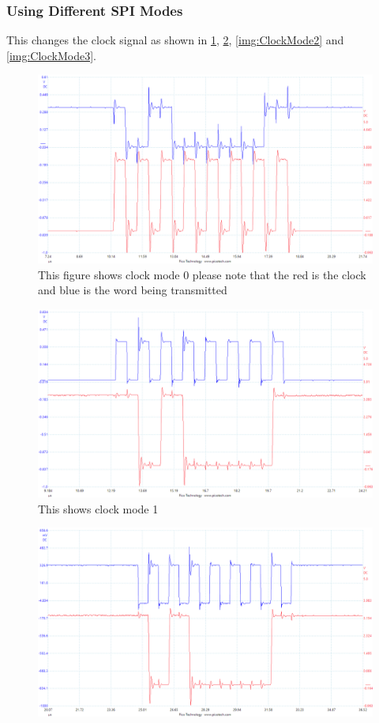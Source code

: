 \documentclass[a4paper,12pt]{scrartcl}
\begin{document}
{{			\subsubsection{Using Different SPI Modes}
			{
				This changes the clock signal as shown in \cref{img:ClockMode0}, \cref{img:ClockMode1}, \cref{img:ClockMode2} and \cref{img:ClockMode3}.
				\begin{figure}[h]
					\centering
					\includegraphics[width=\textwidth]{Ex1/mode0}
					\caption{This figure shows clock mode 0 please note that the red is the clock and blue is the word being transmitted}
					\label{img:ClockMode0}
				\end{figure}
				\begin{figure}[h]
					\centering
					\includegraphics[width=\textwidth]{Ex1/mode1}
					\caption{This shows clock mode 1}
					\label{img:ClockMode1}
				\end{figure}
				\begin{figure}[h]
					\centering
					\includegraphics[width=\textwidth]{Ex1/mode2}

\end{figure}}}}
\end{document}
